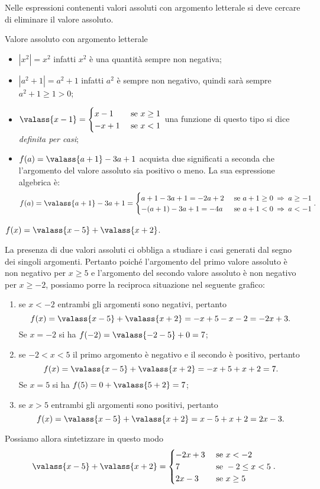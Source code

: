 Nelle espressioni contenenti valori assoluti con argomento letterale si deve cercare di eliminare il
valore assoluto.
\pagebreak
\begin{exrig}
 \begin{esempio}
 Valore assoluto con argomento letterale
 \begin{itemize}
 \item $\left|{x^{2}}\right|=x^{2}$ infatti $x^{2}$ è una quantità sempre non negativa;
 \item $\left|{a^{2}+1}\right|=a^{2}+1$ infatti $a^{2}$ è sempre non negativo, quindi sarà sempre $a^2+1 \ge 1 > 0$;
 \item $\valass{x-1}=\begin{cases}
x-1 & \text{ se }x\ge 1\\
-x+1 & \text{ se }x<1
\end{cases}$ una funzione di questo tipo si dice \emph{definita per casi};
 \item $f(a)=\valass{a+1}-3a+1$ acquista due significati a seconda che l'argomento del valore assoluto sia positivo o meno. La sua espressione algebrica è:
\[
f(a)=\valass{a+1}-3a+1=
\begin{cases}
a+1-3a+1=-2a+2 & \text{ se }a+1\ge 0\:\Rightarrow\: a\ge-1\\
-(a+1)-3a+1=-4a & \text{ se }a+1< 0\:\Rightarrow\: a<-1
\end{cases}.
\]
 \end{itemize}
 \end{esempio}
\begin{esempio}
 $f(x)=\valass{x-5}+\valass{x+2}$.

 La presenza di due valori assoluti ci obbliga a studiare i casi generati dal segno dei singoli argomenti.
 Pertanto poiché l'argomento del primo valore assoluto è non negativo per $x\ge 5$ e l'argomento del secondo valore assoluto è non negativo
 per $x\ge -2$, possiamo porre la reciproca situazione nel seguente grafico:
\begin{center}

\end{center}

\begin{enumerate}[label={(\Alph*)}]
 \item se $x<-2$ entrambi gli argomenti sono negativi, pertanto 
\[f(x)=\valass{x-5}+\valass{x+2}=-x+5-x-2=-2x+3.\]
Se $x=-2$ si ha $f(-2)=\valass{-2-5}+0=7$;
 \item se $-2<x<5$ il primo argomento è negativo e il secondo è positivo, pertanto 
\[f(x)=\valass{x-5}+\valass{x+2}=-x+5+x+2=7.\]
Se $x=5$ si ha $f(5)=0+\valass{5+2}=7$;
 \item se $x>5$ entrambi gli argomenti sono positivi, pertanto 
\[f(x)=\valass{x-5}+\valass{x+2}=x-5+x+2=2x-3.\]
\end{enumerate}
Possiamo allora sintetizzare in questo modo
\[
\valass{x-5}+\valass{x+2}=
\begin{cases}
-2x+3 & \text{ se }x<-2\\
7 & \text{ se }-2\le x<5\\
2x-3 & \text{ se }x\ge 5
\end{cases}.
\]
\end{esempio}
\end{exrig}
\ovalbox{\risolvii \ref{ese:1.7}, \ref{ese:1.8}, \ref{ese:1.9}, \ref{ese:1.10}, \ref{ese:1.11}}

\newpage



\cleardoublepage